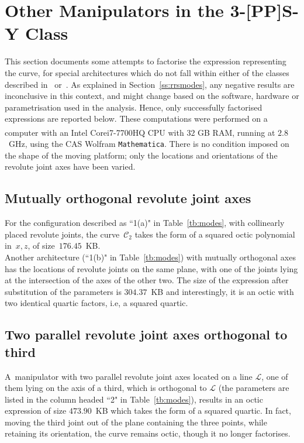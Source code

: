 \documentclass[DD]{iitmdiss}
\newcommand{\mref}[1]{\ref{#1}}
\newcommand{\mcite}[1]{\cite{#1}}
\begin{document}
\section{Other Manipulators in the 3-[PP]S-Y Class}
%
This section documents some attempts to factorise the expression representing the curve, for special architectures which do not fall within either of the classes described in~\mcite{nayak2018a} or~\mcite{nayak2018b}. As explained in Section~\mref{ss:rrsmodes}, any negative results are inconclusive in this context, and might change based on the software, hardware or parametrisation used in the analysis. Hence, only successfully factorised expressions are reported below. These computations were performed on a computer with an Intel\textsuperscript{\textregistered} Core\texttrademark \quad i7-7700HQ CPU with $32$ GB RAM, running at $2.8$~GHz, using the CAS Wolfram \verb|Mathematica|. There is no condition imposed on the shape of the moving platform; only the locations and orientations of the revolute joint axes have been varied.
%
\subsection{Mutually orthogonal revolute joint axes}
%
For the configuration described as ``1(a)" in Table~\mref{tb:modes}, with collinearly placed revolute joints, the curve~$\mathcal{C}_2$ takes the form of a squared octic polynomial in~$x,z$, of size~$176.45$~KB.\\
Another architecture (``1(b)" in Table~\mref{tb:modes}) with mutually orthogonal axes has the locations of revolute joints on the same plane, with one of the joints lying at the intersection of the axes of the other two. The size of the expression after substitution of the parameters is $304.37$~KB and interestingly, it is an octic with two identical quartic factors, i.e, a squared quartic.
%
\subsection{Two parallel revolute joint axes orthogonal to third}
%
A~\rps manipulator with two parallel revolute joint axes located on a line $\mathcal{L}$, one of them lying on the axis of a third, which is orthogonal to $\mathcal{L}$ (the parameters are listed in the column headed ``2" in Table~\mref{tb:modes}), results in an octic expression of size $473.90$~KB which takes the form of a squared quartic. In fact, moving the third joint out of the plane containing the three points, while retaining its orientation, the curve remains octic, though it no longer factorises.
%
\end{document}
